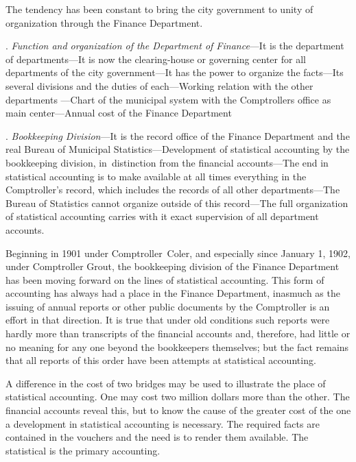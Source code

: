 \documentclass[openany,nobib]{tufte-book}
\begin{document}
The tendency has been constant to bring the city government to unity of
organization through the Finance Department.~

\vspace{.15in}

\enlargethispage{\baselineskip}

.\emph{ Function and organization of the Department of Finance}---It is
the department of departments---It is now the clearing-house or
governing center for all departments of the city government---It has the
power to organize the facts---Its several divisions and the duties of
each---Working relation with the other departments ---Chart of the
municipal system with the Comptroller\textquotesingle s office as main
center---Annual cost of the Finance Department~

\vspace{.15in}

. \emph{Bookkeeping Division}---It is the record office of the Finance
Department and the real Bureau of Municipal Statistics---Development of
statistical accounting by the bookkeeping division, in~distinction from
the financial accounts---The end in statistical accounting is to make
available at all times everything in the Comptroller's record, which
includes the records of all other departments---The Bureau of Statistics
cannot organize outside of this record---The full organization of
statistical accounting carries with it exact supervision of all
department accounts.~

Beginning in 1901 under Comptroller~Coler, and especially since January
1, 1902, under Comptroller Grout, the bookkeeping division of the
Finance Department has been moving forward on the lines of statistical
accounting. This form of accounting has always had a place in the
Finance Department, inasmuch as the issuing of annual reports or other
public documents by the Comptroller is an effort in that direction. It
is true that under old conditions such reports were hardly more than
transcripts of the financial accounts and, therefore, had little or no
meaning for any one beyond the bookkeepers themselves; but the fact
remains that all reports of this order have been attempts at statistical
accounting.~~

A difference in the cost of two bridges may be used to illustrate the
place of statistical accounting. One may cost two million dollars more
than the other. The financial accounts reveal this, but to know the
cause of the greater cost of the one a development in statistical
accounting is necessary. The required facts are contained in the
vouchers and the need is to render them available. The statistical is
the primary accounting.~~
\end{document}
